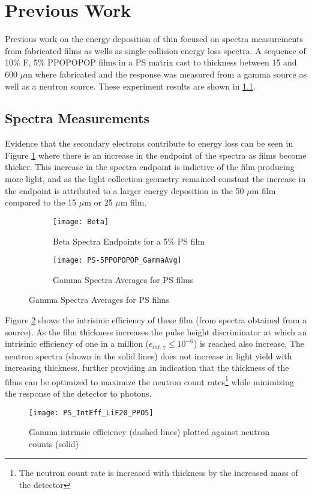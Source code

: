 
\section{Previous Work}
\label{sec:PreviousWork}
Previous work on the energy deposition of thin focused on spectra measurements from fabricated films as wells as single collision energy loss spectra.
A sequence of 10\% F, 5\% PPOPOPOP films in a PS matrix cast to thickness between 15 and 600 $\mu$m where fabricated and the response was measured from a gamma source as well as a neutron source.
These experiment results are shown in \ref{sec:SpectraMeasurements}.


\subsection{Spectra Measurements}
\label{sec:SpectraMeasurements}
Evidence that the secondary electrons contribute to energy loss can be seen in Figure \ref{fig:SpectraFeatures} where there is an increase in the endpoint of the spectra as films become thicker.
This increase in the spectra endpoint is indictive of the film producing more light, and as the light collection geometry remained constant the increase in the endpoint is attributed to a larger energy deposition in the 50 $\mu$m film compared to the 15 $\mu$m or 25 $\mu$m film.
\begin{figure}
    \centering
    \caption{Spectra properties as a function of film thickness}
    \begin{subfigure}[b]{0.45\figurewidth}
        \texttt{[image: Beta]}
        \caption{Beta Spectra Endpoints for a 5\% PS film}
    \end{subfigure}
    \begin{subfigure}[b]{0.45\figurewidth}
        \texttt{[image: PS-5PPOPOPOP\_GammaAvg]}
        \caption{Gamma Spectra Averages for PS films}
    \end{subfigure}
    \label{fig:SpectraFeatures}
\end{figure}
Figure \ref{fig:GammaIntrNeutronCounts} shows the intrisinic efficiency of these film (from spectra obtained from a  source).
As the film thickness increases the pulse height discriminator at which an intrisinic efficiency of one in a million ($\epsilon_{int,\gamma} \le 10^{-6}$) is reached also increase.
The neutron spectra (shown in the solid lines) does not increase in light yield with increasing thickness, further providing an indication that the thickness of the films can be optimized to maximize the neutron count rates\footnote{The neutron count rate is increased with thickness by the increased mass of the detector} while minimizing the response of the detector to photons.
\begin{figure}
    \centering
    \caption{Gamma intrinsic efficiency (dashed lines) plotted against neutron counts (solid)}
    \texttt{[image: PS\_IntEff\_LiF20\_PPO5]}
    \label{fig:GammaIntrNeutronCounts}
\end{figure}

